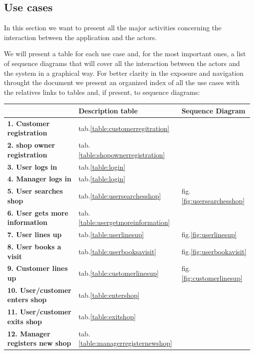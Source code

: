 \subsection{Use cases}
\label{subsect:usecases} 

In this section we want to present all the major activities concerning the interaction between the application and the actors.

We will present a table for each use case and, for the most important ones, a list of sequence diagrams that will cover all the interaction between the actors and the system in a graphical way. For better clarity in the exposure and navigation throught the document we present an organized index of all the use cases with the relatives links to tables and, if present, to sequence diagrams:
\begin{table}[h!]
    \centering
    \begin{tabular}{@{}P{0.57\textwidth}P{0.20\textwidth}P{0.20\textwidth}@{}}
        & \textbf{Description table} & \textbf{Sequence Diagram}\\
        \toprule
        \textbf{1. Customer registration} & tab.\ref{table:customerregitration} & \\
        \textbf{2. shop owner registration} & tab.\ref{table:shopownerregistration} & \\
        \textbf{3. User logs in} & tab.\ref{table:login} & \\
        \textbf{4. Manager logs in} & tab.\ref{table:login} & \\
        \textbf{5. User searches shop}& tab.\ref{table:usersearchesshop} & fig.\ref{fig:usersearchesshop}\\
        \textbf{6. User gets more information} & tab.\ref{table:usergetmoreinformation}& \\
        \textbf{7. User lines up} & tab.\ref{table:userlinesup} & fig.\ref{fig:userlinesup}\\
        \textbf{8. User books a visit} & tab.\ref{table:userbooksavisit} & fig.\ref{fig:userbookavisit}\\
        \textbf{9. Customer lines up} & tab.\ref{table:customerlinesup}& fig.\ref{fig:customerlinesup}\\
        \textbf{10. User/customer enters shop} & tab.\ref{table:entershop} & \\
        \textbf{11. User/customer exits shop} & tab.\ref{table:exitshop} & \\
        \textbf{12. Manager registers new shop} & tab.\ref{table:managerregisternewshop} & \\

\end{tabular}
\end{table}
